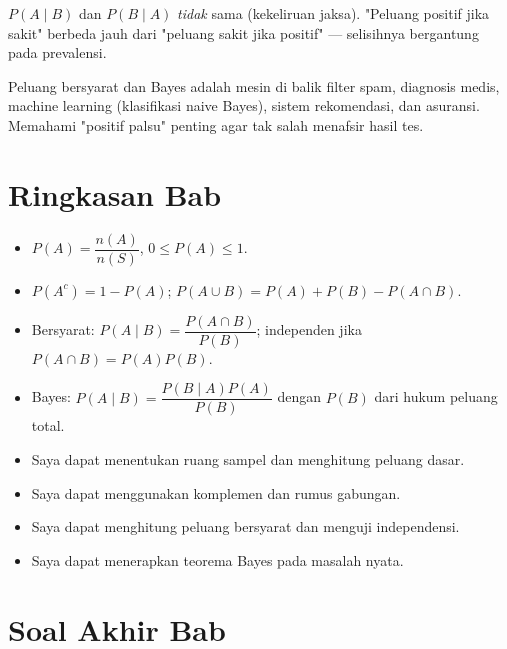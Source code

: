 \documentclass[11pt,a4paper]{report}
\theoremstyle{gaya}
\newcommand{\cek}{\ding{113}\ } %
\begin{document}
\begin{kesalahan}
$P(A\mid B)$ dan $P(B\mid A)$ \emph{tidak} sama (kekeliruan jaksa). "Peluang positif jika sakit" berbeda jauh dari "peluang sakit jika positif" --- selisihnya bergantung pada prevalensi.
\end{kesalahan}

\begin{dunianyata}
Peluang bersyarat dan Bayes adalah mesin di balik filter spam, diagnosis medis, machine learning (klasifikasi naive Bayes), sistem rekomendasi, dan asuransi. Memahami "positif palsu" penting agar tak salah menafsir hasil tes.
\end{dunianyata}

\section*{Ringkasan Bab}
\begin{itemize}[leftmargin=*,topsep=2pt]
  \item $P(A)=\dfrac{n(A)}{n(S)}$, $0\le P(A)\le1$.
  \item $P(A^c)=1-P(A)$; $P(A\cup B)=P(A)+P(B)-P(A\cap B)$.
  \item Bersyarat: $P(A\mid B)=\dfrac{P(A\cap B)}{P(B)}$; independen jika $P(A\cap B)=P(A)P(B)$.
  \item Bayes: $P(A\mid B)=\dfrac{P(B\mid A)P(A)}{P(B)}$ dengan $P(B)$ dari hukum peluang total.
\end{itemize}

\begin{refleksi}
\begin{itemize}[leftmargin=*,topsep=2pt]
  \item[\cek] Saya dapat menentukan ruang sampel dan menghitung peluang dasar.
  \item[\cek] Saya dapat menggunakan komplemen dan rumus gabungan.
  \item[\cek] Saya dapat menghitung peluang bersyarat dan menguji independensi.
  \item[\cek] Saya dapat menerapkan teorema Bayes pada masalah nyata.
\end{itemize}
\end{refleksi}

\section*{Soal Akhir Bab \thechapter}
\end{document}
